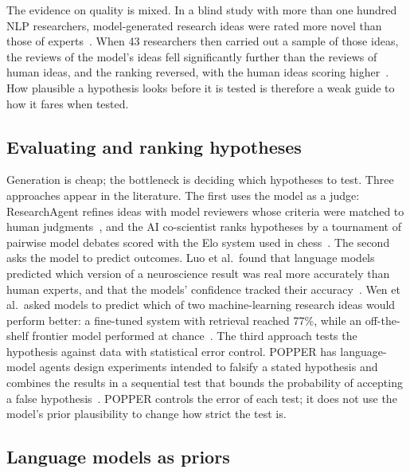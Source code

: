 \documentclass[11pt]{article}
\begin{document}
The evidence on quality is mixed. In a blind study with more than one hundred NLP researchers,
model-generated research ideas were rated more novel than those of experts~\cite{si2024}. When 43
researchers then carried out a sample of those ideas, the reviews of the model's ideas fell
significantly further than the reviews of human ideas, and the ranking reversed, with the human ideas
scoring higher~\cite{ideationgap}.
How plausible a hypothesis looks before it is tested is therefore a weak guide to how it fares when
tested.

\subsection{Evaluating and ranking hypotheses}

Generation is cheap; the bottleneck is deciding which hypotheses to test. Three approaches appear in the
literature. The first uses the model as a judge: ResearchAgent refines ideas with model reviewers whose
criteria were matched to human judgments~\cite{researchagent}, and the AI co-scientist ranks hypotheses
by a tournament of pairwise model debates scored with the Elo system used in chess~\cite{coscientist}.
The second asks the model to predict outcomes. Luo et al.\ found that language models predicted which
version of a neuroscience result was real more accurately than human experts, and that the models'
confidence tracked their accuracy~\cite{brainbench}. Wen et al.\ asked models to predict which of two
machine-learning research ideas would perform better: a fine-tuned system with retrieval reached 77\%,
while an off-the-shelf frontier model performed at chance~\cite{predictoutcomes}. The third approach
tests the hypothesis against data with statistical error control. POPPER has language-model agents
design experiments intended to falsify a stated hypothesis and combines the results in a sequential test
that bounds the probability of accepting a false hypothesis~\cite{falsify}. POPPER controls the error
of each test; it does not use the model's prior plausibility to change how strict the test is.

\subsection{Language models as priors}
\end{document}
